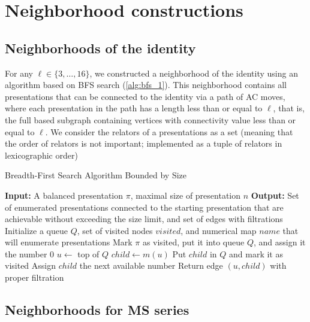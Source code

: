 
\section{Neighborhood constructions}\label{s:neighborhoods}

\subsection{Neighborhoods of the identity}

For any $\ell \in \{3, \dots, 16\}$, we constructed a neighborhood of the identity using an algorithm based on BFS search (\autoref{alg:bfs_1}).
This neighborhood contains all presentations that can be connected to the identity via a path of AC moves, where each presentation in the path has a length less than or equal to $\ell$, that is, the full based subgraph containing vertices with connectivity value less than or equal to $\ell$.
We consider the relators of a presentations as a set (meaning that the order of relators is not important; implemented as a tuple of relators in lexicographic order) 

\begin{algorithm}
	\caption{Breadth-First Search Algorithm Bounded by Size}
	\label{alg:bfs_1}
	\begin{algorithmic}[1]
		\State \textbf{Input:} A balanced presentation $\pi$, maximal size of presentation $n$
		\State \textbf{Output:} Set of enumerated presentations connected to the starting presentation that are achievable without exceeding the size limit, and set of edges with filtrations
		\State Initialize a queue $Q$, set of visited nodes $visited$, and numerical map $name$ that will enumerate presentations
		\State Mark $\pi$ as visited, put it into queue $Q$, and assign it the number $0$
		\State $u \gets $ top of $Q$ 
		\State $child \gets m(u)$
		\State Put $child$ in $Q$ and mark it as visited
		\State Assign $child$ the next available number
		\EndIf
		\State Return edge $(u, child)$ with proper filtration
		\EndIf
		\EndFor
		\EndWhile
	\end{algorithmic}
\end{algorithm}

\subsection{Neighborhoods for MS series}

